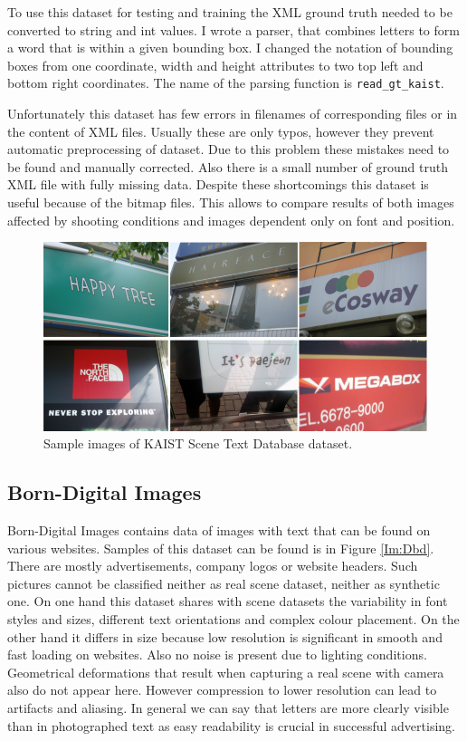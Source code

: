 To use this dataset for testing and training the XML ground truth needed to be converted to string and int values. I wrote a parser, that combines letters to form a word that is within a given bounding box. I changed the notation of bounding boxes from one coordinate, width and height attributes to two top left and bottom right coordinates. The name of the parsing function is \texttt{read\_gt\_kaist}.

Unfortunately this dataset has few errors in filenames of corresponding files or in the content of XML files. Usually these are only typos, however they prevent automatic preprocessing of dataset. Due to this problem these mistakes need to be found and  manually corrected. Also there is a small number of ground truth XML file with fully missing data. 
Despite these shortcomings this dataset is useful because of the bitmap files. This allows to compare results of both images affected by shooting conditions and images dependent only on font and position.

\begin{figure}[hbtp]
    \centering
    \includegraphics[scale=0.4]{obrazky/Dataset_kaist.png}
    \caption{Sample images of KAIST Scene Text Database dataset.}
    \label{Im:Dkaist}
\end{figure}

\subsection{Born-Digital Images}

Born-Digital Images contains data of images with text that can be found on various websites. Samples of this dataset can be found is in Figure \ref*{Im:Dbd}. There are mostly advertisements, company logos or website headers. Such pictures cannot be classified neither as real scene dataset, neither as synthetic one. On one hand  this dataset shares with scene datasets the variability in font styles and sizes, different text orientations and complex colour placement. On the other hand it differs in size because low resolution is significant in smooth and fast loading on websites. Also no noise is present due to lighting conditions. Geometrical deformations that result when capturing a real scene with camera also do not appear here. However compression to lower resolution can lead to artifacts and aliasing. In general we can say that letters are more clearly visible than in photographed text as easy readability is crucial in successful advertising.\cite{born-digital1}

